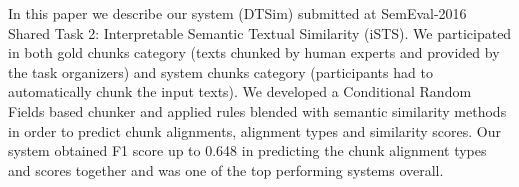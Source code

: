 In this paper we describe our system (DTSim) submitted at SemEval-2016 Shared Task 2: Interpretable Semantic Textual Similarity (iSTS). We participated in both gold chunks category (texts chunked by human experts and provided by the task organizers) and system chunks category (participants had to automatically chunk the input texts). We developed a Conditional Random Fields based chunker and applied rules blended with semantic similarity methods in order to predict chunk alignments, alignment types and similarity scores. Our system obtained F1 score up to 0.648 in predicting the chunk alignment types and scores together and was one of the top performing systems overall.
